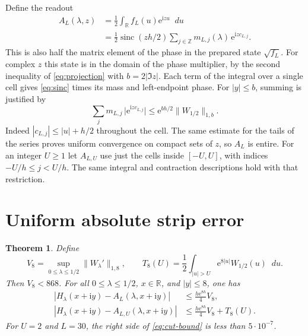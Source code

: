 \documentclass[11pt]{article}
\newtheorem{theorem}{Theorem}[section]
\DeclareMathOperator{\sinc}{sinc}
\newcommand{\R}{\mathbb R}
\newcommand{\dd}{\mathop{}\!d}
\newcommand{\ee}{\mathrm e}
\newcommand{\ii}{\mathrm i}
\newcommand{\abs}[1]{\lvert#1\rvert}
\newcommand{\norm}[1]{\lVert#1\rVert}
\begin{document}
Define the readout
\begin{equation}\label{eq:readout}
 \begin{split}
 A_L(\lambda,z)
  &=\frac12\int_{\R} f_L(u)\ee^{\ii zu}\dd u\\
  &=\frac12\sinc(zh/2)\sum_{j\in\mathbb Z}
                   m_{L,j}(\lambda)\,\ee^{\ii zc_{L,j}}.
 \end{split}
\end{equation}
This is also half the matrix element of the phase in the
prepared state \(\sqrt{f_L}\). For complex \(z\) this state is
in the domain of the phase multiplier, by the second inequality
of \eqref{eq:projection} with \(b=2|\Im z|\).
Each term of the integral over a single cell gives
\eqref{eq:sinc} times its mass and left-endpoint phase.
For \(|y|\le b\), summing is justified by
\[
 \sum_j m_{L,j}\,\abs{\ee^{\ii zc_{L,j}}}
 \le \ee^{bh/2}\norm{W_{1/2}}_{1,b}.
\]
Indeed \(|c_{L,j}|\le |u|+h/2\) throughout the cell.
The same estimate for the tails of the series proves uniform
convergence on compact sets of \(z\), so \(A_L\) is entire.
For an integer \(U\ge1\) let \(A_{L,U}\) use just the cells
inside \([-U,U]\), with indices \(-U/h\le j<U/h\).
The same integral and contraction descriptions hold with that
restriction.

\section{Uniform absolute strip error}\label{sec:strip}

\begin{theorem}\label{thm:strip}
Define
\[
 V_8=\sup_{0\le\lambda\le1/2}\norm{W_\lambda'}_{1,8},
 \qquad
 T_8(U)=\frac12\int_{|u|>U}\ee^{8|u|}W_{1/2}(u)\dd u .
\]
Then \(V_8<868\). For all \(0\le\lambda\le1/2\), \(x\in\R\),
and \(|y|\le8\), one has
\begin{align}
 |H_\lambda(x+\ii y)-A_L(\lambda,x+\ii y)|
     &\le \frac{h\ee^{8h}}4 V_8, \label{eq:full-bound}\\
 |H_\lambda(x+\ii y)-A_{L,U}(\lambda,x+\ii y)|
     &\le \frac{h\ee^{8h}}4 V_8+T_8(U). \label{eq:cut-bound}
\end{align}
For \(U=2\) and \(L=30\), the right side of
\eqref{eq:cut-bound} is less than \(5\cdot10^{-7}\).
\end{theorem}
\end{document}
